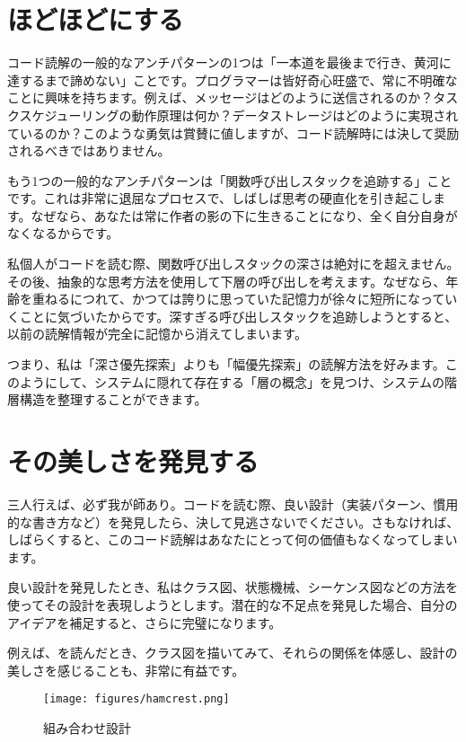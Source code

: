 \section{ほどほどにする}

\begin{content}

コード読解の一般的なアンチパターンの1つは「一本道を最後まで行き、黄河に達するまで諦めない」ことです。プログラマーは皆好奇心旺盛で、常に不明確なことに興味を持ちます。例えば、メッセージはどのように送信されるのか？タスクスケジューリングの動作原理は何か？データストレージはどのように実現されているのか？このような勇気は賞賛に値しますが、コード読解時には決して奨励されるべきではありません。

もう1つの一般的なアンチパターンは「関数呼び出しスタックを追跡する」ことです。これは非常に退屈なプロセスで、しばしば思考の硬直化を引き起こします。なぜなら、あなたは常に作者の影の下に生きることになり、全く自分自身がなくなるからです。

私個人がコードを読む際、関数呼び出しスタックの深さは絶対にを超えません。その後、抽象的な思考方法を使用して下層の呼び出しを考えます。なぜなら、年齢を重ねるにつれて、かつては誇りに思っていた記憶力が徐々に短所になっていくことに気づいたからです。深すぎる呼び出しスタックを追跡しようとすると、以前の読解情報が完全に記憶から消えてしまいます。

つまり、私は「深さ優先探索」よりも「幅優先探索」の読解方法を好みます。このようにして、システムに隠れて存在する「層の概念」を見つけ、システムの階層構造を整理することができます。

\end{content}

\section{その美しさを発見する}

\begin{content}

三人行えば、必ず我が師あり。コードを読む際、良い設計（実装パターン、慣用的な書き方など）を発見したら、決して見逃さないでください。さもなければ、しばらくすると、このコード読解はあなたにとって何の価値もなくなってしまいます。

良い設計を発見したとき、私はクラス図、状態機械、シーケンス図などの方法を使ってその設計を表現しようとします。潜在的な不足点を発見した場合、自分のアイデアを補足すると、さらに完璧になります。

例えば、を読んだとき、クラス図を描いてみて、それらの関係を体感し、設計の美しさを感じることも、非常に有益です。

\begin{figure}[!h]
\centering
\texttt{[image: figures/hamcrest.png]}
\caption{組み合わせ設計}
 \label{fig:hamcrest}
\end{figure}

\end{content}

